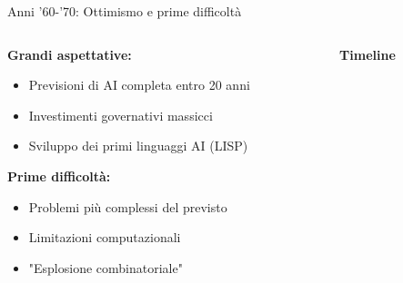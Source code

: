 \documentclass[aspectratio=169,12pt]{beamer}
\begin{document}
\begin{frame}{Anni '60-'70: Ottimismo e prime difficoltà}
    \begin{columns}
        \begin{column}{0.6\textwidth}
            \textbf{Grandi aspettative:}
            \begin{itemize}
                \item Previsioni di AI completa entro 20 anni
                \item Investimenti governativi massicci
                \item Sviluppo dei primi linguaggi AI (LISP)
            \end{itemize}
            
            \vspace{0.3cm}
            
            \textbf{Prime difficoltà:}
            \begin{itemize}
                \item Problemi più complessi del previsto
                \item Limitazioni computazionali
                \item "Esplosione combinatoriale"
            \end{itemize}
        \end{column}
        \begin{column}{0.4\textwidth}
            \begin{center}
                \textbf{Timeline}\\
                \vspace{0.2cm}
            \end{center}
        \end{column}
    \end{columns}
\end{frame}
\end{document}

